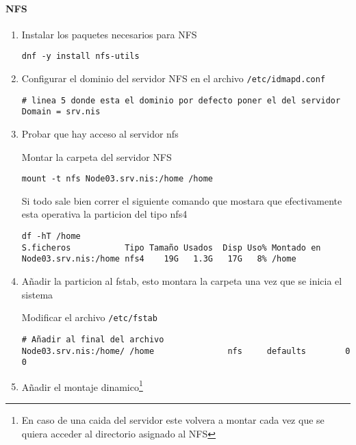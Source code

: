 \documentclass[../main.tex]{subfiles}
\begin{document}
\paragraph{NFS}
\begin{enumerate}
\item Instalar los paquetes necesarios para NFS

  \begin{lstlisting}
dnf -y install nfs-utils
\end{lstlisting}
\item Configurar el dominio del servidor NFS en el
  archivo \lstinline|/etc/idmapd.conf|
  \begin{lstlisting}[label={list:idmap},caption=Modificación del archivo /etc/idmapd.conf]
# linea 5 donde esta el dominio por defecto poner el del servidor
Domain = srv.nis
\end{lstlisting}

\item Probar que hay acceso al servidor nfs

  Montar la carpeta del servidor NFS

  \begin{lstlisting}
mount -t nfs Node03.srv.nis:/home /home
\end{lstlisting}

Si todo sale bien correr el siguiente comando que mostara que
efectivamente esta operativa la particion del tipo nfs4

\begin{lstlisting}
df -hT /home
S.ficheros           Tipo Tamaño Usados  Disp Uso% Montado en
Node03.srv.nis:/home nfs4    19G   1.3G   17G   8% /home
\end{lstlisting}

\item Añadir la particion al fstab, esto montara la carpeta una vez
  que se inicia el sistema

  Modificar el archivo \lstinline|/etc/fstab|

  \begin{lstlisting}[label={list:fstab},caption=Modificación del archivo /etc/fstab]
# Añadir al final del archivo
Node03.srv.nis:/home/ /home               nfs     defaults        0 0
\end{lstlisting}

\item Añadir el montaje dinamico\footnote{En caso de una caida
    del servidor este volvera a montar cada vez que se
    quiera acceder al directorio asignado al NFS}


\end{enumerate}
\end{document}

